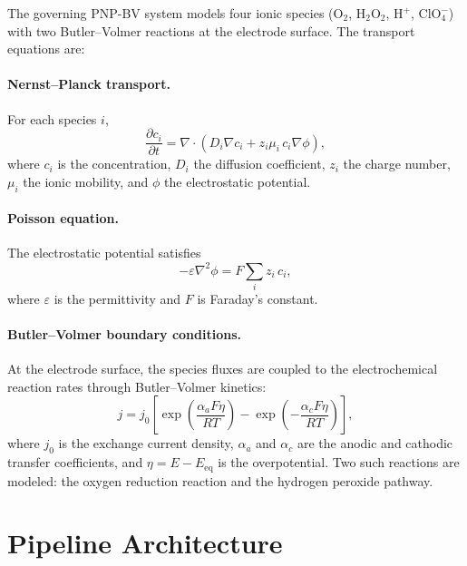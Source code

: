 \documentclass[11pt,a4paper]{article}
\begin{document}
The governing PNP-BV system models four ionic species
($\mathrm{O_2}$, $\mathrm{H_2O_2}$, $\mathrm{H^+}$, $\mathrm{ClO_4^-}$)
with two Butler--Volmer reactions at the electrode surface. The transport
equations are:

\paragraph{Nernst--Planck transport.}
For each species $i$,
\begin{equation}
  \frac{\partial c_i}{\partial t}
  = \nabla \cdot \!\left(
      D_i \nabla c_i + z_i \mu_i\, c_i \nabla \phi
    \right),
  \label{eq:nernst-planck}
\end{equation}
where $c_i$ is the concentration, $D_i$ the diffusion coefficient,
$z_i$ the charge number, $\mu_i$ the ionic mobility, and $\phi$ the
electrostatic potential.

\paragraph{Poisson equation.}
The electrostatic potential satisfies
\begin{equation}
  -\varepsilon \nabla^2 \phi = F \sum_i z_i\, c_i,
  \label{eq:poisson}
\end{equation}
where $\varepsilon$ is the permittivity and $F$ is Faraday's constant.

\paragraph{Butler--Volmer boundary conditions.}
At the electrode surface, the species fluxes are coupled to the
electrochemical reaction rates through Butler--Volmer kinetics:
\begin{equation}
  j = j_0 \left[
    \exp\!\left(\frac{\alpha_a F \eta}{RT}\right)
    - \exp\!\left(-\frac{\alpha_c F \eta}{RT}\right)
  \right],
  \label{eq:butler-volmer}
\end{equation}
where $j_0$ is the exchange current density, $\alpha_a$ and $\alpha_c$
are the anodic and cathodic transfer coefficients, and
$\eta = E - E_\mathrm{eq}$ is the overpotential. Two such reactions are
modeled: the oxygen reduction reaction and the hydrogen peroxide pathway.

\section{Pipeline Architecture}
\label{sec:architecture}
\end{document}
